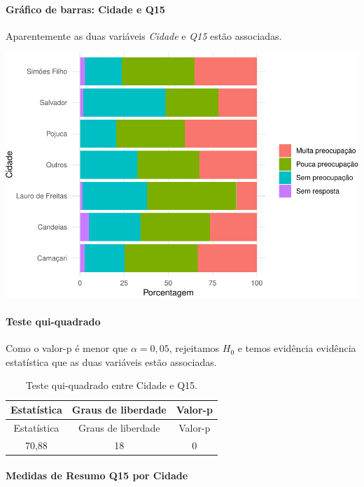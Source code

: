 \documentclass[]{article}
\let\oldparagraph\paragraph
\renewcommand{\paragraph}[1]{\oldparagraph{#1}\mbox{}}
\begin{document}
\hypertarget{gruxe1fico-de-barras-cidade-e-q15}{%
\paragraph{Gráfico de barras: Cidade e Q15}\label{gruxe1fico-de-barras-cidade-e-q15}}

Aparentemente as duas variáveis \emph{Cidade} e \emph{Q15} estão associadas.

\begin{center}\includegraphics[width=0.75\linewidth]{relatorio_files/figure-latex/unnamed-chunk-99-1} \end{center}

\hypertarget{teste-qui-quadrado-7}{%
\paragraph{Teste qui-quadrado}\label{teste-qui-quadrado-7}}

Como o valor-p é menor que \(\alpha=0,05\), rejeitamos \(H_0\) e temos evidência evidência estatística que as duas variáveis estão associadas.

\begin{longtable}[]{@{}ccc@{}}
\caption{\label{tab:unnamed-chunk-100}Teste qui-quadrado entre Cidade e Q15.}\tabularnewline
\toprule
Estatística & Graus de liberdade & Valor-p\tabularnewline
\midrule
\endfirsthead
\toprule
Estatística & Graus de liberdade & Valor-p\tabularnewline
\midrule
\endhead
70,88 & 18 & 0\tabularnewline
\bottomrule
\end{longtable}

\cleardoublepage

\hypertarget{medidas-de-resumo-q15-por-cidade}{%
\paragraph{Medidas de Resumo Q15 por Cidade}\label{medidas-de-resumo-q15-por-cidade}}
\end{document}
